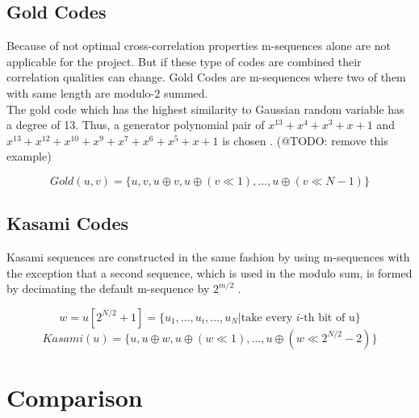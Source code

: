 
\subsection{Gold Codes}

Because of not optimal cross-correlation properties m-sequences alone are not applicable for the project. But if these type of codes are combined their correlation qualities can change. Gold Codes are m-sequences where two of them with same length are modulo-2 summed. \cite{proakis08} \\
The gold code which has the highest similarity to Gaussian random variable has a degree of 13. Thus, a generator polynomial pair of $x^13+x^4+x^3+x+1$ and $x^13+x^12+x^10+x^9+x^7+x^6+x^5+x+1$ is chosen \cite{merrifield} . (@TODO: remove this example)


\begin{equation}
Gold(u,v)=\{u,v,u\oplus v,u\oplus(v \ll1),\dots,u\oplus(v\ll N-1)\}
\end{equation}


\subsection{Kasami Codes}

Kasami sequences are constructed in the same fashion by using m-sequences with the exception that a second sequence, which is used in the modulo sum, is formed by decimating the default m-sequence by  $2^{m/2}$ \cite{proakis08} \cite{sarwate80} \cite{peterson72}. 

\begin{equation}
w=u[2^{N/2}+1]=\{u_1,\dots, u_i, \dots,u_{N}|\text{take every }i\text{-th bit of u}\} 
\end{equation}
\begin{equation}
Kasami(u)=\{u,u\oplus w,u\oplus(w \ll1),\dots,u\oplus(w\ll2^{N/2}-2)\}
\end{equation}


\section{Comparison}

